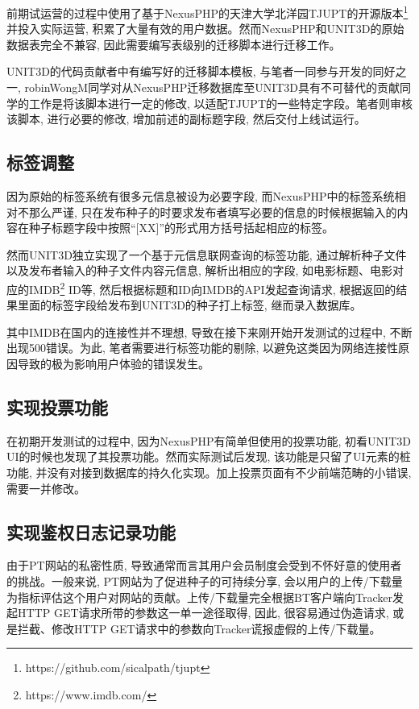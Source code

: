 前期试运营的过程中使用了基于NexusPHP的天津大学北洋园TJUPT的开源版本\footnote{https://github.com/sicalpath/tjupt}并投入实际运营, 积累了大量有效的用户数据。然而NexusPHP和UNIT3D的原始数据表完全不兼容, 因此需要编写表级别的迁移脚本进行迁移工作。

UNIT3D的代码贡献者中有编写好的迁移脚本模板, 与笔者一同参与开发的同好之一, robinWongM同学对从NexusPHP迁移数据库至UNIT3D具有不可替代的贡献同学的工作是将该脚本进行一定的修改, 以适配TJUPT的一些特定字段。笔者则审核该脚本, 进行必要的修改, 增加前述的副标题字段, 然后交付上线试运行。

\subsection{标签调整}

因为原始的标签系统有很多元信息被设为必要字段, 而NexusPHP中的标签系统相对不那么严谨, 只在发布种子的时要求发布者填写必要的信息的时候根据输入的内容在种子标题字段中按照``[XX]''的形式用方括号括起相应的标签。 

然而UNIT3D独立实现了一个基于元信息联网查询的标签功能, 通过解析种子文件以及发布者输入的种子文件内容元信息, 解析出相应的字段, 如电影标题、电影对应的IMDB\footnote{https://www.imdb.com/} ID等, 然后根据标题和ID向IMDB的API发起查询请求, 根据返回的结果里面的标签字段给发布到UNIT3D的种子打上标签, 继而录入数据库。

其中IMDB在国内的连接性并不理想, 导致在接下来刚开始开发测试的过程中, 不断出现500错误。为此, 笔者需要进行标签功能的剔除, 以避免这类因为网络连接性原因导致的极为影响用户体验的错误发生。

\subsection{实现投票功能}

在初期开发测试的过程中, 因为NexusPHP有简单但使用的投票功能, 初看UNIT3D UI的时候也发现了其投票功能。然而实际测试后发现, 该功能是只留了UI元素的桩功能, 并没有对接到数据库的持久化实现。加上投票页面有不少前端范畴的小错误, 需要一并修改。

\subsection{实现鉴权日志记录功能}

由于PT网站的私密性质, 导致通常而言其用户会员制度会受到不怀好意的使用者的挑战。一般来说, PT网站为了促进种子的可持续分享, 会以用户的上传/下载量为指标评估这个用户对网站的贡献。上传/下载量完全根据BT客户端向Tracker发起HTTP GET请求所带的参数这一单一途径取得, 因此, 很容易通过伪造请求, 或是拦截、修改HTTP GET请求中的参数向Tracker谎报虚假的上传/下载量。

